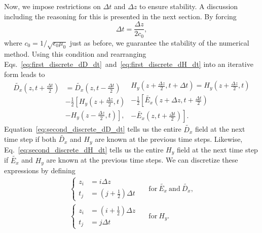 \documentclass[12pt,twocolumn]{article}
\begin{document}
Now, we impose restrictions on $\Delta t$ and $\Delta z$ to ensure stability. A discussion including the reasoning for this is presented in the next section. By forcing
\begin{equation}
\Delta t=\frac{\Delta z}{2c_0},
\end{equation}
 where $c_0=1/\sqrt{\epsilon_0\mu_0}$ just as before, we guarantee the stability of the numerical method. Using this condition and rearranging Eqs.~\ref{eq:first_discrete_dD_dt}~and~\ref{eq:first_discrete_dH_dt} into an iterative form leads to
\begin{subequations}
\begin{equation}
\label{eq:second_discrete_dD_dt}\begin{split}
\tilde{D_x}\left(z,t+\frac{\Delta t}{2}\right)&=\tilde{D_x}\left(z,t-\frac{\Delta t}{2}\right) \\
&   -\frac{1}{2}\left[H_y\left(z+\frac{\Delta z}{2},t\right)\right. \\
&- \left. H_y\left(z-\frac{\Delta z}{2},t\right)\right],
\end{split}
\end{equation}
\begin{equation}
\label{eq:second_discrete_dH_dt}\begin{split}
H_y\left(z+\frac{\Delta z}{2},t+\Delta t\right)=H_y\left(z+\frac{\Delta z}{2},t\right) \\
     -\frac{1}{2}\left[\tilde{E_x}\left(z+\Delta z,t+\frac{\Delta t}{2}\right)\right. \\
\left. -\tilde{E_x}\left(z,t+\frac{\Delta t}{2}\right)\right].
\end{split}
\end{equation}
\end{subequations}
Equation~\ref{eq:second_discrete_dD_dt} tells us the entire $\tilde{D_x}$ field at the next time step if both $\tilde{D_x}$ and $H_y$ are known at the previous time steps. Likewise, Eq.~\ref{eq:second_discrete_dH_dt} tells us the entire $H_y$ field at the next time step if $\tilde{E_x}$ and $H_y$ are known at the previous time steps. We can discretize these expressions by defining
\begin{equation}
\begin{aligned}
\left\{
\begin{split}
z_i&=i\Delta z \\
t_j&=\left(j+\frac{1}{2}\right)\Delta t
\end{split}\right.~~&~\mathrm{for}~\tilde{E_x}~\mathrm{and}~\tilde{D_x}, \\
\left\{
\begin{split}
z_i&=\left(i+\frac{1}{2}\right)\Delta z \\
t_j&=j\Delta t
\end{split}\right.~~&~\mathrm{for}~H_y.
\end{aligned}
\end{equation}
\end{document}
